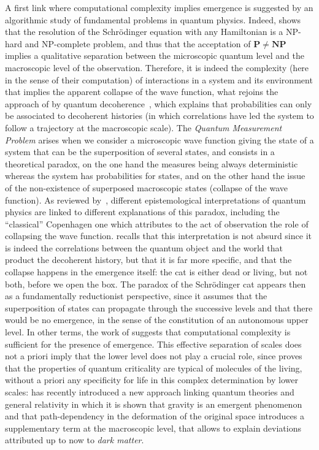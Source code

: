 A first link where computational complexity implies emergence is suggested by an algorithmic study of fundamental problems in quantum physics. Indeed, \cite{2014arXiv1403.7686B} shows that the resolution of the Schrödinger equation with any Hamiltonian is a NP-hard and NP-complete problem, and thus that the acceptation of $\mathbf{P}\neq\mathbf{NP}$ implies a qualitative separation between the microscopic quantum level and the macroscopic level of the observation. Therefore, it is indeed the complexity (here in the sense of their computation) of interactions in a system and its environment that implies the apparent collapse of the wave function, what rejoins the approach of  by quantum decoherence~\cite{gell1996quantum}, which explains that probabilities can only be associated to decoherent histories (in which correlations have led the system to follow a trajectory at the macroscopic scale). The \emph{Quantum Measurement Problem} arises when we consider a microscopic wave function giving the state of a system that can be the superposition of several states, and consists in a theoretical paradox, on the one hand the measures being always deterministic whereas the system has probabilities for states, and on the other hand the issue of the non-existence of superposed macroscopic states (collapse of the wave function). As reviewed by~\cite{schlosshauer2005decoherence}, different epistemological interpretations of quantum physics are linked to different explanations of this paradox, including the ``classical'' Copenhagen one which attributes to the act of observation the role of collapsing the wave function.  recalls that this interpretation is not absurd since it is indeed the correlations between the quantum object and the world that product the decoherent history, but that it is far more specific, and that the collapse happens in the emergence itself: the cat is either dead or living, but not both, before we open the box. The paradox of the Schrödinger cat appears then as a fundamentally reductionist perspective, since it assumes that the superposition of states can propagate through the successive levels and that there would be no emergence, in the sense of the constitution of an autonomous upper level. In other terms, the work of \cite{2014arXiv1403.7686B} suggests that computational complexity is sufficient for the presence of emergence. This effective separation of scales does not a priori imply that the lower level does not play a crucial role, since \cite{vattay2015quantum} proves that the properties of quantum criticality are typical of molecules of the living, without a priori any specificity for life in this complex determination by lower scales: \cite{2016arXiv161102269V} has recently introduced a new approach linking quantum theories and general relativity in which it is shown that gravity is an emergent phenomenon and that path-dependency in the deformation of the original space introduces a supplementary term at the macroscopic level, that allows to explain deviations attributed up to now to \emph{dark matter}.

